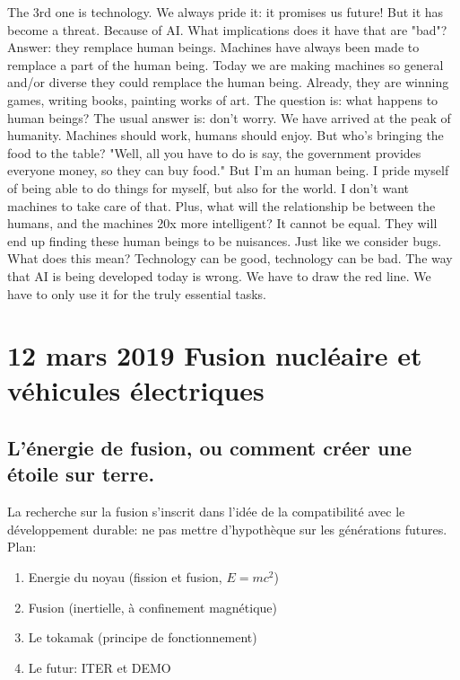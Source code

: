 \documentclass{article}
\begin{document}
The 3rd one is technology. We always pride it: it promises us future! But it has become a threat. Because of AI. What implications does it have that are "bad"? Answer: they remplace human beings. Machines have always been made to remplace a part of the human being. Today we are making machines so general and/or diverse they could remplace the human being. Already, they are winning games, writing books, painting works of art. The question is: what happens to human beings? The usual answer is: don't worry. We have arrived at the peak of humanity. Machines should work, humans should enjoy. But who's bringing the food to the table? "Well, all you have to do is say, the government provides everyone money, so they can buy food." But I'm an human being. I pride myself of being able to do things for myself, but also for the world. I don't want machines to take care of that. Plus, what will the relationship be between the humans, and the machines 20x more intelligent? It cannot be equal. They will end up finding these human beings to be nuisances. Just like we consider bugs. \\
What does this mean? Technology can be good, technology can be bad. The way that AI is being developed today is wrong. We have to draw the red line. We have to only use it for the truly essential tasks.


\section{12 mars 2019 \quad Fusion nucléaire et véhicules électriques}
\subsection{L'énergie de fusion, ou comment créer une étoile sur terre.}
La recherche sur la fusion s'inscrit dans l'idée de la compatibilité avec le développement durable: ne pas mettre d'hypothèque sur les générations futures.
Plan:
\begin{enumerate}
	\item Energie du noyau (fission et fusion, $E = mc^2$)
	\item Fusion (inertielle, à confinement magnétique)
	\item Le tokamak (principe de fonctionnement)
	\item Le futur: ITER et DEMO
\end{enumerate}
\end{document}
